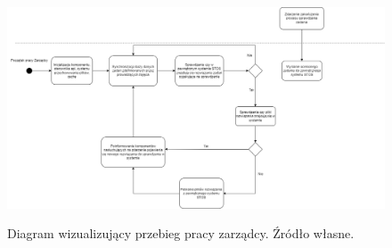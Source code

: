 \begin{figure}[!ht]
	\begin{center}
		\resizebox{1\textwidth}{!} {
			\includegraphics{img/3/zarzadca-diagram-aktywnosci.png}
		}
		\caption[Diagram aktywności zarządcy]{Diagram wizualizujący przebieg pracy zarządcy. Źródło własne.}
		\label{fig:scheduler-activity-diagram}
	\end{center}
\end{figure}


